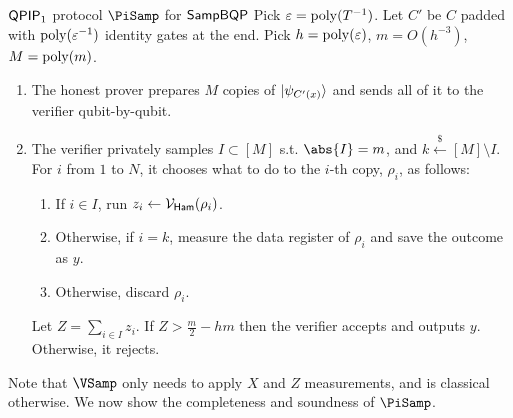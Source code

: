 \begin{protocol}{$\operatorname{\mathsf{QPIP}}_1$ protocol $\PiSamp$ for $\operatorname{\mathsf{SampBQP}}$}\label{ProtoQPIP1}
	Pick $\varepsilon=\operatorname*{\operatorname{poly}}(T^{-1})$.
	Let $C'$ be $C$ padded with $\operatorname*{\operatorname{poly}}(\varepsilon^{-1})$ identity gates at the end.
	Pick $h=\operatorname*{\operatorname{poly}}(\varepsilon)$, $m=O(h^{-3})$, $M=\operatorname*{\operatorname{poly}}(m)$.

	\begin{enumerate}
		\item The honest prover prepares $M$ copies of $\ket{\psi_{C'(x)}}$ and sends all of it to the verifier qubit-by-qubit.
		\item The verifier privately samples $I\subset[M]$ s.t. $\abs{I}=m$, and $k\xleftarrow{\$}[M]\setminus I$.
			For $i$ from $1$ to $N$, it chooses what to do to the $i$-th copy, $\rho_i$, as follows:
		\begin{enumerate}
			\item If $i\in I$, run $z_i\leftarrow\mathcal{V}_{\mathsf{Ham}}(\rho_i)$.
			\item Otherwise, if $i=k$, measure the data register of $\rho_i$ and save the outcome as $y$.
			\item Otherwise, discard $\rho_i$.
		\end{enumerate}
			Let $Z=\sum_{i\in I} z_i$. If $Z>\frac{m}{2}-hm$ then the verifier accepts and outputs $y$. Otherwise, it rejects.
	\end{enumerate}
\end{protocol}

Note that $\VSamp$ only needs to apply $X$ and $Z$ measurements, and is classical otherwise. We now show the completeness and soundness of $\PiSamp$.

